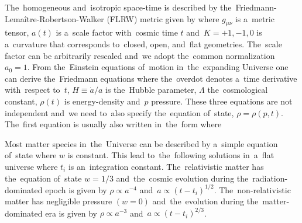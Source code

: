 The~homogeneous and~isotropic space-time is described by the~Friedmann-Lema\^{i}tre-Robertson-Walker (FLRW) metric given by
where $g_{\mu\nu}$ is a~metric tensor, $a(t)$ is a~scale factor with~cosmic time $t$ and~$K=+1,-1,0$ is a~curvature that corresponds to~closed, open, and~flat geometries. The~scale factor can be arbitrarily rescaled and~we adopt the~common normalization $a_0=1$. From the~Einstein equations of~motion in~the~expanding Universe one can derive the~Friedmann equations
where the~overdot denotes a~time derivative with~respect to~$t$, $H\equiv\dot a/a$ is the~Hubble parameter, $\Lambda$ the~cosmological constant, $\rho(t)$ is energy-density and~$p$ pressure. These three equations are not independent and~we need to~also specify the~equation of~state, $\rho=\rho(p,t)$. The~first equation is usually also written in~the~form
where

Most matter species in~the~Universe can be described by a~simple equation of~state
where $w$ is constant. This lead to~the~following solutions in~a~flat universe
where $t_i$ is an~integration constant. The~relativistic matter has the~equation of~state $w=1/3$ and~the~cosmic evolution during the~radiation-dominated epoch is given by $\rho\propto a^{-4}$ and~$a\propto(t-t_i)^{1/2}$. The~non-relativistic matter has negligible pressure $(w=0)$ and~the~evolution during the~matter-dominated era is given by $\rho\propto a^{-3}$ and~$a\propto(t-t_i)^{2/3}$.

